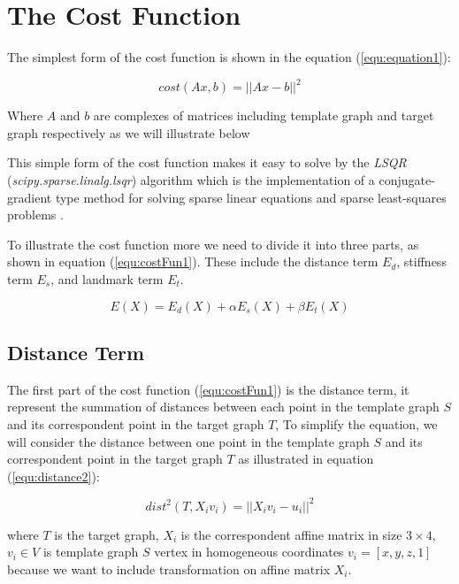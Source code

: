 \documentclass[../structure.tex]{subfiles}
\begin{document}

\section{The Cost Function}
\hspace{2em}The simplest form of the cost function is shown in the equation (\ref{equ:equation1}):

\begin{equation}
\label{equ:equation1}
cost(Ax,b) = ||Ax-b||^2
\end{equation}

Where $A$ and $b$ are complexes of matrices including template graph and target graph respectively as we will illustrate below

This simple form of the cost function makes it easy to solve by the \textit{LSQR} (\textit{scipy.sparse.linalg.lsqr}) algorithm which is the implementation of a conjugate-gradient type method for solving sparse linear equations and sparse least-squares problems \cite{Paige1982a}.

To illustrate the cost function more we need to divide it into three parts, as shown in equation (\ref{equ:costFun1}). These include the distance term $E_{d}$, stiffness term $E_{s}$, and landmark term $E_{t}$.

\begin{equation}
E(X) = E_{d}(X) + \alpha E_{s}(X) + \beta E_{t}(X)
\label{equ:costFun1}
\end{equation}

\subsection{Distance Term}
\hspace{2em}The first part of the cost function (\ref{equ:costFun1}) is the distance term, it represent the summation of distances between each point in the template graph $S$ and its correspondent point in the target graph $T$, To simplify the equation, we will consider the distance between one point in the template graph $S$ and its correspondent point in the target graph $T$ as illustrated in equation (\ref{equ:distance2}):

\begin{equation}
dist^2(T,X_{i}v_{i}) = ||X_{i}v_{i}-u_{i}||^2
\label{equ:distance2}
\end{equation}

where $T$ is the target graph, $X_{i}$ is the correspondent affine matrix in size $3\times4$, $v_{i}\in V$ is template graph $S$ vertex in homogeneous coordinates $v_{i} = [x,y,z,1]$ because we want to include transformation on affine matrix $X_{i}$.
\end{document}

